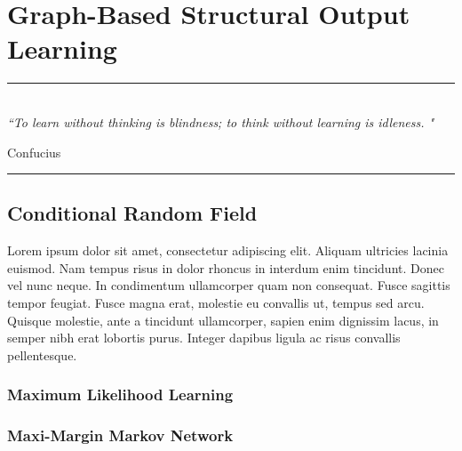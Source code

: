 
\chapter{Graph-Based Structural Output Learning} %
\label{Chapter3} %



\rule{\textwidth}{0.4pt} \\[0.5cm]
\textit{``To learn without thinking is blindness; to think without learning is idleness. "}

\begin{flushright}
Confucius
\end{flushright}
\rule{\textwidth}{0.4pt} 



\section{Conditional Random Field}

Lorem ipsum dolor sit amet, consectetur adipiscing elit. Aliquam ultricies lacinia euismod. Nam tempus risus in dolor rhoncus in interdum enim tincidunt. Donec vel nunc neque. In condimentum ullamcorper quam non consequat. Fusce sagittis tempor feugiat. Fusce magna erat, molestie eu convallis ut, tempus sed arcu. Quisque molestie, ante a tincidunt ullamcorper, sapien enim dignissim lacus, in semper nibh erat lobortis purus. Integer dapibus ligula ac risus convallis pellentesque.

\subsection{Maximum Likelihood Learning}
\subsection{Maxi-Margin Markov Network}






